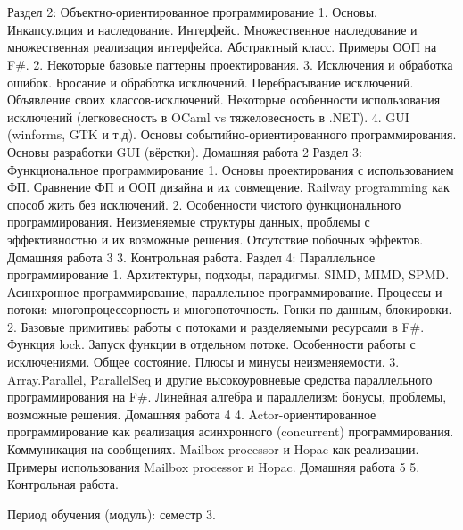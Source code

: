 \section{}

Раздел 2: Объектно-ориентированное программирование
    1. Основы. Инкапсуляция и наследование. Интерфейс. Множественное наследование и множественная реализация интерфейса. Абстрактный класс. Примеры ООП на F#. 
    2. Некоторые базовые паттерны проектирования.
    3. Исключения и обработка ошибок. Бросание и обработка исключений. Перебрасывание исключений. Объявление своих классов-исключений. Некоторые особенности использования исключений (легковесность в OCaml vs тяжеловесность в .NET).
    4. GUI (winforms, GTK и т.д). Основы событийно-ориентированного программирования. Основы разработки GUI (вёрстки).
Домашняя работа 2
Раздел 3: Функциональное программирование
    1. Основы проектирования с использованием ФП. Сравнение ФП и ООП дизайна и их совмещение.  Railway programming как способ жить без исключений. 
    2. Особенности чистого функционального программирования. Неизменяемые структуры данных, проблемы с эффективностью и их возможные решения. Отсутствие побочных эффектов.
Домашняя работа 3 
    3. Контрольная работа.
Раздел 4: Параллельное программирование
    1. Архитектуры, подходы, парадигмы. SIMD, MIMD, SPMD. Асинхронное программирование, параллельное программирование. Процессы и потоки: многопроцессорность и многопоточность. Гонки по данным, блокировки.  
    2. Базовые примитивы работы с потоками и разделяемыми ресурсами в F#. Функция lock. Запуск функции в отдельном потоке. Особенности работы с исключениями. Общее состояние. Плюсы и минусы неизменяемости.
    3. Array.Parallel, ParallelSeq и другие высокоуровневые средства параллельного программирования на F#. Линейная алгебра и параллелизм: бонусы, проблемы, возможные решения.
Домашняя работа 4
    4. Actor-ориентированное программирование как реализация асинхронного (concurrent) программирования. Коммуникация на сообщениях. Mailbox processor и Hopac как реализации. Примеры использования Mailbox processor и Hopac.
Домашняя работа 5
    5. Контрольная работа.

Период обучения (модуль): семестр 3.


